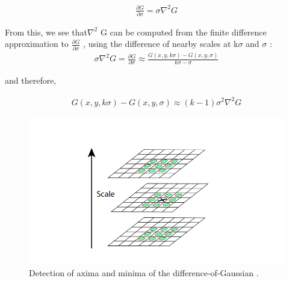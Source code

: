 \begin{align}
    \frac {\partial G} {\partial \sigma} = \sigma \nabla^2 G 
\end{align}




From this, we see that$\nabla^2$ G can be computed from the finite difference approximation to  $\frac{\partial G}{\partial \sigma }$ , using the difference of nearby scales at k$\sigma$ and $\sigma$ :\\


\begin{align}
      \sigma \nabla^2 G =   \frac {\partial G} {\partial \sigma} \approx   \frac {G(x,y,k \sigma) -  G(x,y,\sigma)}{ k \sigma - \sigma}  
\end{align}


and therefore,


\begin{align}
      G(x,y,k \sigma) -  G(x,y,\sigma)  \approx (k - 1)  \sigma^2\nabla^2G 
\end{align}

\begin{figure}[H]
\centering
\includegraphics[width=1.0\textwidth]{img/sift2.PNG}
\caption{ Detection of axima and minima of the difference-of-Gaussian .}
\label{fig:sift2}
\end{figure}

